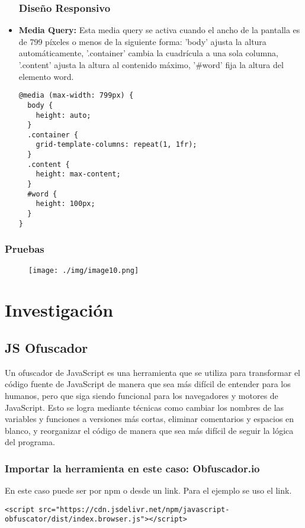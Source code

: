 \documentclass{article}
\begin{document}
\begin{itemize}
\subsubsection{Diseño Responsivo}
\item{\textbf{Media Query:}
Esta media query se activa cuando el ancho de la pantalla es de 799 píxeles o menos de la siguiente forma: 'body' ajusta la altura automáticamente, '.container' cambia la cuadrícula a una sola columna, '.content' ajusta la altura al contenido máximo, '#word' fija la altura del elemento word.}
\begin{lstlisting}[style=ascii-tree]
@media (max-width: 799px) {
  body {
    height: auto;
  }
  .container {
    grid-template-columns: repeat(1, 1fr);
  }
  .content {
    height: max-content;
  }
  #word {
    height: 100px;
  } 
}
\end{lstlisting}
\end{itemize}
\subsubsection{Pruebas}
\begin{figure}[H]
    \centering
    \texttt{[image: ./img/image10.png]}
\end{figure}

\pagebreak

\section{Investigación}
\subsection{JS Ofuscador}
\item{Un ofuscador de JavaScript es una herramienta que se utiliza para transformar el código fuente de JavaScript de manera que sea más difícil de entender para los humanos, pero que siga siendo funcional para los navegadores y motores de JavaScript. Esto se logra mediante técnicas como cambiar los nombres de las variables y funciones a versiones más cortas, eliminar comentarios y espacios en blanco, y reorganizar el código de manera que sea más difícil de seguir la lógica del programa.}
\subsubsection{Importar la herramienta en este caso: Obfuscador.io}
\item{En este caso puede ser por npm o desde un link. Para el ejemplo se uso el link.}
\begin{lstlisting}[style=ascii-tree]
<script src="https://cdn.jsdelivr.net/npm/javascript-obfuscator/dist/index.browser.js"></script>
\end{lstlisting}
\end{document}
